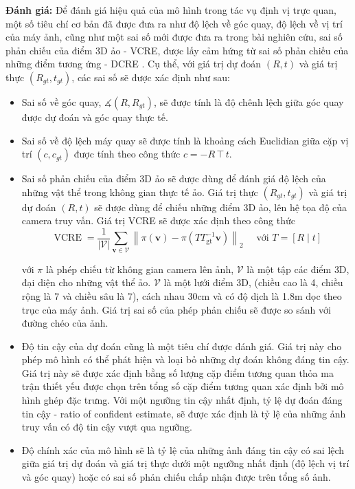 \textbf{Đánh giá:} Để đánh giá hiệu quả của mô hình trong tác vụ định vị trực quan, một số tiêu chí cơ bản đã được đưa ra như độ lệch về góc quay, độ lệch về vị trí của máy ảnh, cũng như một sai số mới được đưa ra trong bài nghiên cứu, sai số phản chiếu của điểm 3D ảo - VCRE, được lấy cảm hứng từ sai số phản chiếu của những điểm tương ứng - DCRE \cite{wald2020beyond}. Cụ thể, với giá trị dự đoán $(R,t)$ và giá trị thực $(R_{gt},t_{gt})$, các sai số sẽ được xác định như sau:
\begin{itemize}
    \item Sai số về góc quay, $\measuredangle(R,R_{gt})$, sẽ được tính là độ chênh lệch giữa góc quay được dự đoán và góc quay thực tế.
    \item Sai số về độ lệch máy quay sẽ được tính là khoảng cách Euclidian giữa cặp vị trí $(c,c_{gt})$ được tính theo công thức $c=-R \intercal t$.
    \item Sai số phản chiếu của điểm 3D ảo sẽ được dùng để đánh giá độ lệch của những vật thể trong không gian thực tế ảo. Giá trị thực $(R_{gt},t_{gt})$ và giá trị dự đoán $(R,t)$ sẽ được dùng để chiếu những điểm 3D ảo, lên hệ tọa độ của camera truy vấn. Giá trị VCRE sẽ được xác định theo công thức
    $$
    \operatorname{VCRE}=\frac{1}{|\mathcal{V}|} \sum_{\mathbf{v} \in \mathcal{V}}\left\|\pi(\mathbf{v})-\pi\left(T T_{\mathrm{gt}}^{-1} \mathbf{v}\right)\right\|_2 \quad \text { với } T=[R \mid t]
    $$

    với $\pi$ là phép chiếu từ không gian camera lên ảnh, $\mathcal{V}$ là một tập các điểm 3D, đại diện cho những vật thể ảo. $\mathcal{V}$ là một lưới điểm 3D, (chiều cao là 4, chiều rộng là 7 và chiều sâu là 7), cách nhau 30cm và có độ dịch là 1.8m dọc theo trục của máy ảnh. Giá trị sai số của phép phản chiếu sẽ được so sánh với đường chéo của ảnh.
    \item Độ tin cậy của dự đoán cũng là một tiêu chí được đánh giá. Giá trị này cho phép mô hình có thể phát hiện và loại bỏ những dự đoán không đáng tin cậy. Giá trị này sẽ được xác định bằng số lượng cặp điểm tương quan thỏa ma trận thiết yếu được chọn trên tổng số cặp điểm tương quan xác định bởi mô hình ghép đặc trưng. Với một ngưỡng tin cậy nhất định, tỷ lệ dự đoán đáng tin cậy - ratio of confident estimate, sẽ được xác định là tỷ lệ của những ảnh truy vấn có độ tin cậy vượt qua ngưỡng.
    \item Độ chính xác của mô hình sẽ là tỷ lệ của những ảnh đáng tin cậy có sai lệch giữa giá trị dự đoán và giá trị thực dưới một ngưỡng nhất định (độ lệch vị trí và góc quay) hoặc có sai số phản chiếu chấp nhận được trên tổng số ảnh.
\end{itemize}


